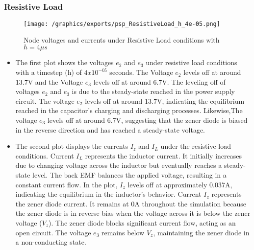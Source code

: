 \subsubsection{Resistive Load}
\begin{figure}[H]
    \centering
    \texttt{[image: /graphics/exports/psp\_ResistiveLoad\_h\_4e-05.png]}
    \caption{Node voltages and currents under Resistive Load conditions with $h=4\mu s$}
\end{figure}
\begin{itemize}
	\item The first plot shows the voltages $e_2$ and $e_3$ under resistive load conditions with a timestep (h) of $4x10^{-05}$ seconds. The Voltage $e_2$ levels off at around 13.7V and the Voltage $e_3$ levels off at around 6.7V. The leveling off of voltages $e_2$ and $e_3$ is due to the steady-state reached in the power supply circuit. The voltage $e_2$ levels off at around 13.7V, indicating the equilibrium reached in the capacitor's charging and discharging processes. Likewise,The voltage $e_3$ levels off at around 6.7V, suggesting that the zener diode is biased in the reverse direction and has reached a steady-state voltage.
    \item The second plot displays the currents $I_z$ and $I_L$ under the resistive load conditions. Current $I_L$ represents the inductor current. It initially increases due to changing voltage across the inductor but eventually reaches a steady-state level. The back EMF balances the applied voltage, resulting in a constant current flow. In the plot, $I_z$ levels off at approximately 0.037A, indicating the equilibrium in the inductor's behavior. Current $I_z$ represents the zener diode current. It remains at 0A throughout the simulation because the zener diode is in reverse bias when the voltage across it is below the zener voltage ($V_z$). The zener diode blocks significant current flow, acting as an open circuit. The voltage $e_3$ remains below $V_z$, maintaining the zener diode in a non-conducting state.
\end{itemize}

